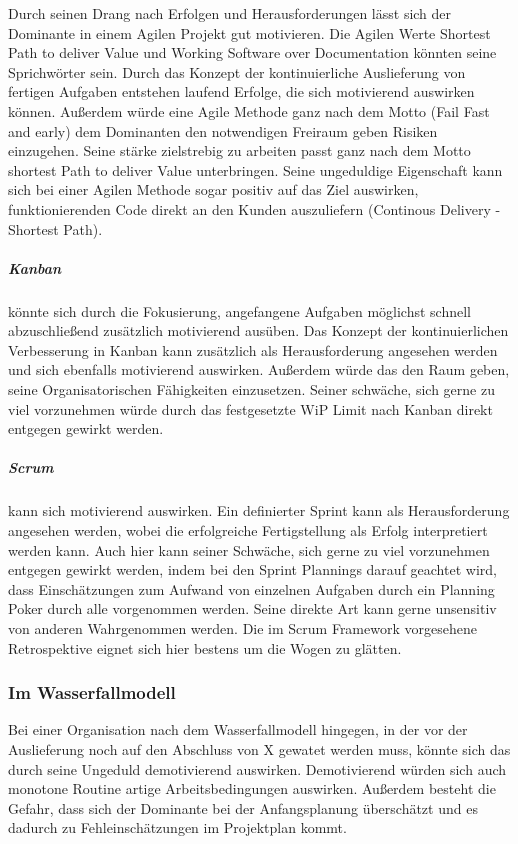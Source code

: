 \documentclass[twocolumn,10pt]{asme2ej}
\begin{document}
Durch seinen Drang nach Erfolgen und Herausforderungen lässt sich der Dominante in einem Agilen Projekt gut motivieren. Die Agilen Werte Shortest Path to deliver Value und Working Software over Documentation könnten seine Sprichwörter sein. Durch das Konzept der kontinuierliche Auslieferung von fertigen Aufgaben entstehen laufend Erfolge, die sich motivierend auswirken können. Außerdem würde eine Agile Methode ganz nach dem Motto (Fail Fast and early) dem Dominanten den notwendigen Freiraum geben Risiken einzugehen. Seine stärke zielstrebig zu arbeiten passt ganz nach dem Motto shortest Path to deliver Value unterbringen. Seine ungeduldige Eigenschaft kann sich bei einer Agilen Methode sogar positiv auf das Ziel auswirken,  funktionierenden Code direkt an den Kunden auszuliefern (Continous Delivery - Shortest Path). 
\subparagraph{Kanban} könnte sich durch die Fokusierung, angefangene Aufgaben möglichst schnell abzuschließend zusätzlich motivierend ausüben. Das Konzept der kontinuierlichen Verbesserung in Kanban kann zusätzlich als Herausforderung angesehen werden und sich ebenfalls motivierend auswirken. Außerdem würde das den Raum geben, seine Organisatorischen Fähigkeiten einzusetzen. Seiner schwäche, sich gerne zu viel vorzunehmen würde durch das festgesetzte  WiP Limit nach Kanban direkt entgegen gewirkt werden.
\subparagraph{Scrum} kann sich motivierend auswirken. Ein definierter Sprint kann als Herausforderung angesehen werden, wobei die erfolgreiche Fertigstellung als Erfolg interpretiert werden kann. Auch hier kann seiner Schwäche, sich gerne zu viel vorzunehmen entgegen gewirkt werden, indem bei den Sprint Plannings darauf geachtet wird, dass Einschätzungen zum Aufwand von einzelnen Aufgaben durch ein Planning Poker durch alle vorgenommen werden. Seine direkte Art kann gerne unsensitiv von anderen Wahrgenommen werden. Die im Scrum Framework vorgesehene Retrospektive eignet sich hier bestens um die Wogen zu glätten.

\subsubsection{Im Wasserfallmodell}

Bei einer Organisation nach dem Wasserfallmodell hingegen, in der vor der Auslieferung noch auf den Abschluss von X gewatet werden muss, könnte sich das durch seine Ungeduld demotivierend auswirken. Demotivierend würden sich auch monotone Routine artige Arbeitsbedingungen auswirken. Außerdem besteht die Gefahr, dass sich der Dominante bei der Anfangsplanung überschätzt und es dadurch zu Fehleinschätzungen im Projektplan kommt. 
\end{document}
